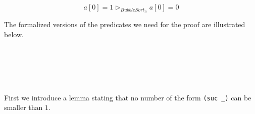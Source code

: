 \begin{equation}
    \label{eq:bubble-proof-1}
    a[0] = 1 \rhd_{BubbleSort_n} a[0] = 0
\end{equation}

The formalized versions of the predicates we need for the proof are illustrated below.

\begin{code}
    \>[0]\AgdaSpace{}%
    \AgdaSymbol{:}\AgdaSpace{}%
    \<%
    \\
    \>[0]\AgdaSpace{}%
    \AgdaSymbol{=}\AgdaSpace{}%
    \AgdaSpace{}%
    \AgdaSymbol{(}\AgdaOperator{\AgdaFunction{v[}}\AgdaSpace{}%
    \AgdaSpace{}%
    \AgdaOperator{\AgdaFunction{]}}\AgdaSpace{}%
    \AgdaOperator{\AgdaFunction{g[}}\AgdaSpace{}%
    \AgdaSpace{}%
    \AgdaSpace{}%
    \AgdaOperator{\AgdaFunction{]}}\AgdaSymbol{)}\AgdaSpace{}%
    \AgdaSymbol{(}\AgdaSpace{}%
    \AgdaSymbol{)}\<%
    \\
    \\[\AgdaEmptyExtraSkip]%
    \>[0]\AgdaSpace{}%
    \AgdaSymbol{:}\AgdaSpace{}%
    \<%
    \\
    \>[0]\AgdaSpace{}%
    \AgdaSymbol{=}\AgdaSpace{}%
    \AgdaSpace{}%
    \AgdaSymbol{(}\AgdaOperator{\AgdaFunction{v[}}\AgdaSpace{}%
    \AgdaSpace{}%
    \AgdaOperator{\AgdaFunction{]}}\AgdaSpace{}%
    \AgdaOperator{\AgdaFunction{g[}}\AgdaSpace{}%
    \AgdaSpace{}%
    \AgdaSpace{}%
    \AgdaOperator{\AgdaFunction{]}}\AgdaSymbol{)}\AgdaSpace{}%
    \AgdaSymbol{(}\AgdaSpace{}%
    \AgdaSymbol{)}\<%
\end{code}

\newpage

First we introduce a lemma stating that no number of the form \verb|(suc _)| can be smaller than $1$.

\begin{code}
    \>[0]\AgdaSpace{}%
    \AgdaSymbol{:}\AgdaSpace{}%
    \AgdaSymbol{\{}\AgdaSpace{}%
    \AgdaSymbol{:}\AgdaSpace{}%
    \AgdaSymbol{\}}\AgdaSpace{}%
    \AgdaSpace{}%
    \AgdaSpace{}%
    \AgdaSpace{}%
    \AgdaOperator{\AgdaFunction{<}}\AgdaSpace{}%
    \AgdaSpace{}%
    \AgdaSpace{}%
    \<%
    \\
    \>[0]\AgdaSpace{}%
    \AgdaSymbol{(}\AgdaSpace{}%
    \AgdaSymbol{())}\<%
\end{code}

